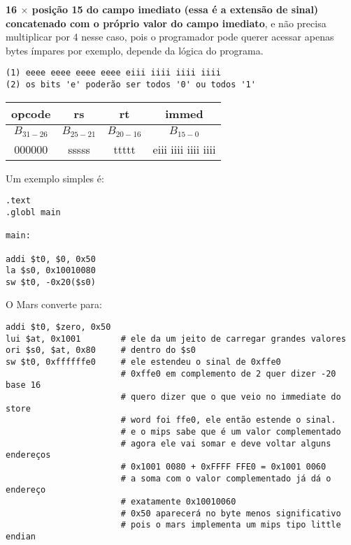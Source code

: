 \documentclass{article}
\begin{document}
\textbf{16 $\times$ {posição 15 do campo imediato} (essa é a extensão de
sinal) concatenado com o próprio valor do campo imediato}, e não precisa
multiplicar por 4 nesse caso, pois o programador pode querer acessar apenas
bytes ímpares por exemplo, depende da lógica do programa.

\begin{verbatim}
(1) eeee eeee eeee eeee eiii iiii iiii iiii
(2) os bits 'e' poderão ser todos '0' ou todos '1'
\end{verbatim}

\begin{table}[ht!]
  \begin{tabular}{|c|c|c|c|}
    \hline opcode & rs & rt & immed \\
    \hline $B_{31-26}$ & $B_{25-21}$ & $B_{20-16}$ & $B_{15-0}$ \\
    \hline 000000 & sssss & ttttt & eiii iiii iiii iiii \\
    \hline
  \end{tabular}
\end{table}

Um exemplo simples é:

\begin{verbatim}
.text
.globl main

main:

addi $t0, $0, 0x50
la $s0, 0x10010080
sw $t0, -0x20($s0)
\end{verbatim}

O Mars converte para:

\begin{verbatim}
addi $t0, $zero, 0x50
lui $at, 0x1001        # ele da um jeito de carregar grandes valores
ori $s0, $at, 0x80     # dentro do $s0
sw $t0, 0xffffffe0     # ele estendeu o sinal de 0xffe0
                       # 0xffe0 em complemento de 2 quer dizer -20 base 16
                       # quero dizer que o que veio no immediate do store
                       # word foi ffe0, ele então estende o sinal.
                       # e o mips sabe que é um valor complementado
                       # agora ele vai somar e deve voltar alguns endereços
                       # 0x1001 0080 + 0xFFFF FFE0 = 0x1001 0060
                       # a soma com o valor complementado já dá o endereço
                       # exatamente 0x10010060
                       # 0x50 aparecerá no byte menos significativo
                       # pois o mars implementa um mips tipo little endian
\end{verbatim}
\end{document}
